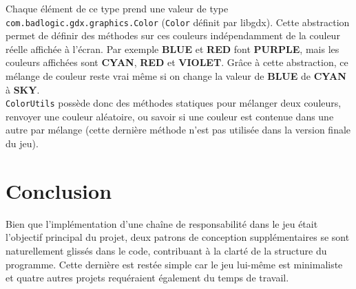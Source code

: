 \documentclass[11pt,a4paper,twoside,svgnames]{article}
\begin{document}
Chaque élément de ce type prend une valeur de type \texttt{com.badlogic.gdx.graphics.Color} (\texttt{Color} définit par libgdx). Cette abstraction permet de définir des méthodes sur ces couleurs indépendamment de la couleur réelle affichée à l'écran. Par exemple \textbf{BLUE} et \textbf{RED} font \textbf{PURPLE}, mais les couleurs affichées sont \textbf{CYAN}, \textbf{RED} et \textbf{VIOLET}. Grâce à cette abstraction, ce mélange de couleur reste vrai même si on change la valeur de \textbf{BLUE} de \textbf{CYAN} à \textbf{SKY}.\\

\texttt{ColorUtils} possède donc des méthodes statiques pour mélanger deux couleurs, renvoyer une couleur aléatoire, ou savoir si une couleur est contenue dans une autre par mélange (cette dernière méthode n'est pas utilisée dans la version finale du jeu).

\clearpage

\section{Conclusion}
Bien que l'implémentation d'une chaîne de responsabilité dans le jeu était l'objectif principal du projet, deux patrons de conception supplémentaires se sont naturellement glissés dans le code, contribuant à la clarté de la structure du programme. Cette dernière est restée simple car le jeu lui-même est minimaliste et quatre autres projets requéraient également du temps de travail.
\end{document}
